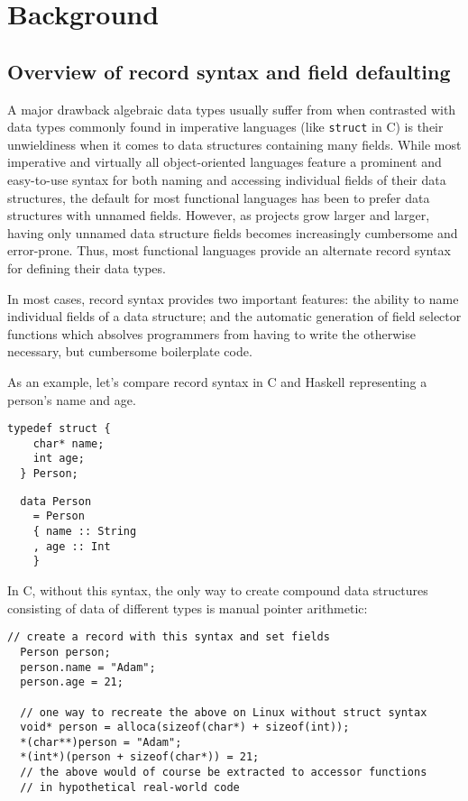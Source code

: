 \documentclass[en]{pracamgr}
\newcommand{\code}[1]{\lstinline[breaklines=true]{#1}}
\begin{document}
\chapter{Background}\label{ch:bg}
\section{Overview of record syntax and field defaulting}
A major drawback algebraic data types usually suffer from when contrasted with data types commonly found in imperative languages 
(like \code{struct} in C) is their unwieldiness when it comes to data structures containing many fields.
While most imperative and virtually all object-oriented languages feature a prominent and easy-to-use syntax 
for both naming and accessing individual fields of their data structures, the default for most functional languages
has been to prefer data structures with unnamed fields.
However, as projects grow larger and larger, having only unnamed data structure fields becomes increasingly cumbersome and error-prone.
Thus, most functional languages provide an alternate record syntax for defining their data types. 

In most cases, record syntax provides two important features: 
the ability to name individual fields of a data structure; 
and the automatic generation of field selector functions which
absolves programmers from having to write the otherwise necessary,
but cumbersome boilerplate code.

As an example, let's compare record syntax in C and Haskell representing a person's name and age.

\begin{lstlisting}[style=c]
  typedef struct {
    char* name;
    int age;
  } Person;
\end{lstlisting}

\begin{lstlisting}
  data Person 
    = Person 
    { name :: String
    , age :: Int
    }
\end{lstlisting}
In C, without this syntax, the only way to create compound data structures consisting of data of different types is manual pointer arithmetic:\\
\begin{minipage}{\linewidth}
\begin{lstlisting}[style=c]
  // create a record with this syntax and set fields
  Person person;
  person.name = "Adam";
  person.age = 21;

  // one way to recreate the above on Linux without struct syntax
  void* person = alloca(sizeof(char*) + sizeof(int));
  *(char**)person = "Adam";
  *(int*)(person + sizeof(char*)) = 21;
  // the above would of course be extracted to accessor functions
  // in hypothetical real-world code
\end{lstlisting}
\end{minipage}
\end{document}
